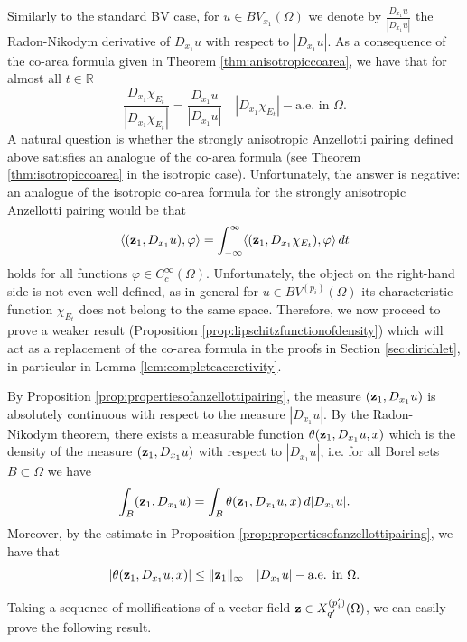 \documentclass[reqno,12pt]{amsart}
\def\z{{\bf z}}
\def\R{\mathbb R}
\numberwithin{equation}{section}
\begin{document}
Similarly to the standard BV case, for $u \in BV_{x_1}(\Omega)$ we denote by $\frac{D_{x_1} u}{|D_{x_1} u|}$ the Radon-Nikodym derivative of $D_{x_1 }u$ with respect to $|D_{x_1} u|$. As a consequence of the co-area formula given in Theorem \ref{thm:anisotropiccoarea}, we have that for almost all $t \in \R$ 
$$ \frac{D_{x_1} \chi_{E_t}}{|D_{x_1} \chi_{E_t}|} = \frac{D_{x_1} u}{|D_{x_1} u|} \quad |D_{x_1} \chi_{E_t}|-\mbox{a.e. in } \Omega.$$
A natural question is whether the strongly anisotropic Anzellotti pairing defined above satisfies an analogue of the co-area formula (see Theorem \ref{thm:isotropiccoarea} in the isotropic case). Unfortunately, the answer is negative: an analogue of the isotropic co-area formula for the strongly anisotropic Anzellotti pairing would be that
\begin{equation*}
\langle (\z_1, D_{x_1} u), \varphi \rangle = \int_{-\infty}^\infty \langle (\z_1, D_{x_1} \chi_{E_t}),\varphi \rangle \, dt
\end{equation*}
holds for all functions $\varphi \in C_c^\infty(\Omega)$. Unfortunately, the object on the right-hand side is not even well-defined, as in general for $u \in BV^{(p_i)}(\Omega)$ its characteristic function $\chi_{E_t}$ does not belong to the same space. Therefore, we now proceed to prove a weaker result (Proposition \ref{prop:lipschitzfunctionofdensity}) which will act as a replacement of the co-area formula in the proofs in Section \ref{sec:dirichlet}, in particular in Lemma \ref{lem:completeaccretivity}.

By Proposition \ref{prop:propertiesofanzellottipairing}, the measure $(\z_1 ,D_{x_1} u)$ is absolutely continuous with respect to the measure $|D_{x_1} u|$. By the Radon-Nikodym theorem, there exists a measurable function $\theta(\z_1,D_{x_1} u,x)$ which is the density of the measure $(\z_1,D_{x_1} u)$ with respect to $|D_{x_1} u|$, i.e. for all Borel sets $B \subset \Omega$ we have
\begin{equation}\label{Borel}
\int_B (\z_1, D_{x_1} u) = \int_B \theta(\z_1, D_{x_1} u,x) \, d|D_{x_1} u|.
\end{equation}
Moreover, by the estimate in Proposition \ref{prop:propertiesofanzellottipairing}, we have that 
$$|\theta(\z_1, D_{x_1} u,x)| \leq \| \z_1 \|_\infty \quad |D_{x_1} u|-\mbox{a.e. in } \Omega.$$

Taking a sequence of mollifications of a vector field $\z \in X_{q'}^{(p'_i)}(\Omega)$, we can easily prove the following result.
\end{document}
